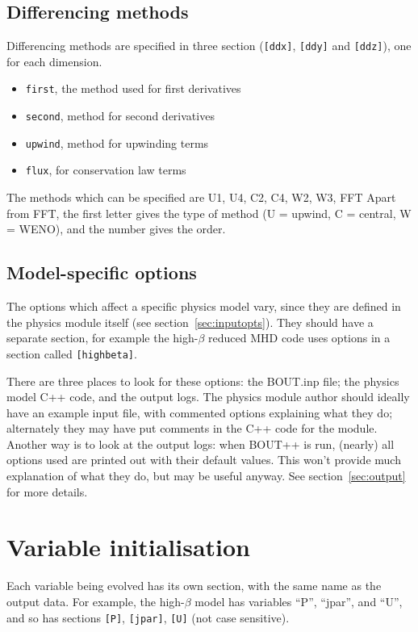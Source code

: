 \documentclass[12pt]{article}
\newcommand{\code}[1]{\texttt{#1}}
\begin{document}
\subsection{Differencing methods}
%
\label{sec:diffmethodoptions}
%
%
Differencing methods are specified in three section (\code{[ddx]}, \code{[ddy]}
and \code{[ddz]}), one for each dimension.
%
\begin{itemize}
\item \code{first}, the method used for first derivatives
\item \code{second}, method for second derivatives
\item \code{upwind}, method for upwinding terms
\item \code{flux}, for conservation law terms
\end{itemize}
%
The methods which can be specified are U1, U4, C2, C4, W2, W3, FFT Apart from
FFT, the first letter gives the type of method (U = upwind, C = central, W =
WENO), and the number gives the order.



\subsection{Model-specific options}
%
The options which affect a specific physics model vary, since they are defined
in the physics module itself (see section~\ref{sec:inputopts}). They should
have a separate section, for example the high-$\beta$ reduced MHD code uses
options in a section called \code{[highbeta]}.

There are three places to look for these options: the BOUT.inp file; the
physics model C++ code, and the output logs. The physics module author should
ideally have an example input file, with commented options explaining what they
do; alternately they may have put comments in the C++ code for the module.
Another way is to look at the output logs: when BOUT++ is run, (nearly) all
options used are printed out with their default values. This won't provide much
explanation of what they do, but may be useful anyway.  See
section~\ref{sec:output} for more details.





\section{Variable initialisation}
%
%
Each variable being evolved has its own section, with the same name as the
output data. For example, the high-$\beta$ model has variables ``P'', ``jpar'',
and ``U'', and so has sections \code{[P]}, \code{[jpar]}, \code{[U]} (not case
sensitive).
\end{document}
